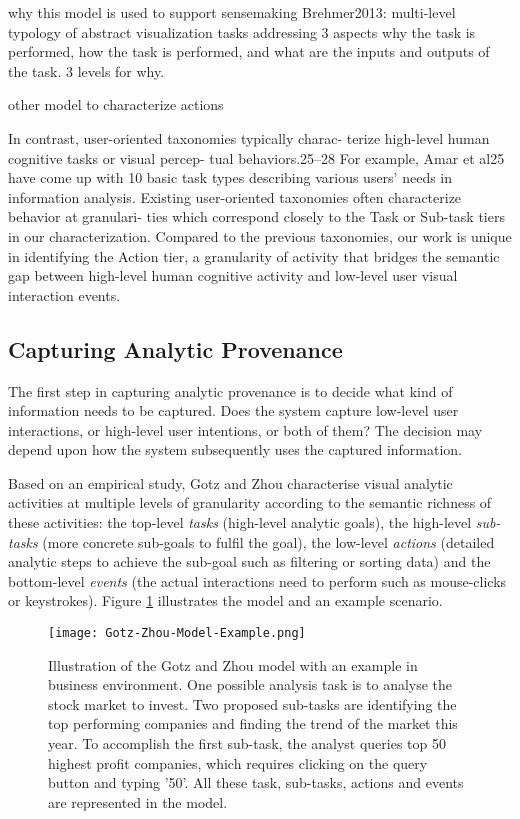 why this model is used to support sensemaking
Brehmer2013: multi-level typology of abstract visualization tasks addressing 3 aspects why the task is performed, how the task is performed, and what are the inputs and outputs of the task. 3 levels for why.

other model to characterize actions

In contrast, user-oriented taxonomies typically charac- terize high-level human cognitive tasks or visual percep-
tual behaviors.25–28 For example, Amar et al25 have come up with 10 basic task types describing various users’ needs in information analysis. Existing user-oriented taxonomies often characterize behavior at granulari- ties which correspond closely to the Task or Sub-task tiers in our characterization. Compared to the previous taxonomies, our work is unique in identifying the Action tier, a granularity of activity that bridges the semantic gap between high-level human cognitive activity and low-level user visual interaction events.


\subsection{Capturing Analytic Provenance}
The first step in capturing analytic provenance is to decide what kind of information needs to be captured. Does the system capture low-level user interactions, or high-level user intentions, or both of them? The decision may depend upon how the system subsequently uses the captured information.

Based on an empirical study, Gotz and Zhou \cite{Gotz2009} characterise visual analytic activities at multiple levels of granularity according to the semantic richness of these activities: the top-level \textit{tasks} (high-level analytic goals), the high-level \textit{sub-tasks} (more concrete sub-goals to fulfil the goal), the low-level \textit{actions} (detailed analytic steps to achieve the sub-goal such as filtering or sorting data) and the bottom-level \textit{events} (the actual interactions need to perform such as mouse-clicks or keystrokes). Figure \ref{fig:Gotz-Zhou-Model} illustrates the model and an example scenario.

\begin{figure}[ht]
\centering
\texttt{[image: Gotz-Zhou-Model-Example.png]}
\caption{Illustration of the Gotz and Zhou model \cite{Gotz2009} with an example in business environment. One possible analysis task is to analyse the stock market to invest. Two proposed sub-tasks are identifying the top performing companies and finding the trend of the market this year. To accomplish the first sub-task, the analyst queries top 50 highest profit companies, which requires clicking on the query button and typing '50'. All these task, sub-tasks, actions and events are represented in the model.}
\label{fig:Gotz-Zhou-Model}
\end{figure}

